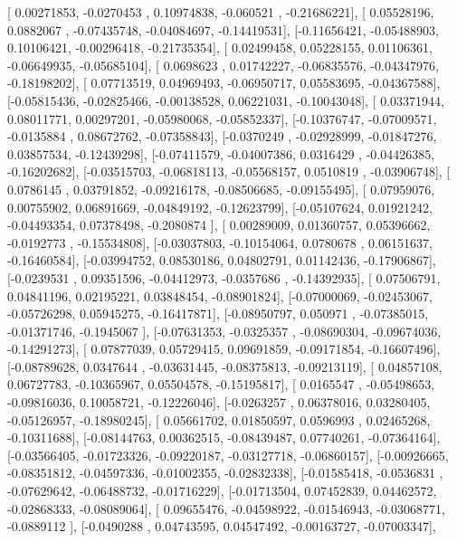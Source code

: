 \documentclass{article}
\begin{document}
       [ 0.00271853, -0.0270453 ,  0.10974838, -0.060521  , -0.21686221],
       [ 0.05528196,  0.0882067 , -0.07435748, -0.04084697, -0.14419531],
       [-0.11656421, -0.05488903,  0.10106421, -0.00296418, -0.21735354],
       [ 0.02499458,  0.05228155,  0.01106361, -0.06649935, -0.05685104],
       [ 0.0698623 ,  0.01742227, -0.06835576, -0.04347976, -0.18198202],
       [ 0.07713519,  0.04969493, -0.06950717,  0.05583695, -0.04367588],
       [-0.05815436, -0.02825466, -0.00138528,  0.06221031, -0.10043048],
       [ 0.03371944,  0.08011771,  0.00297201, -0.05980068, -0.05852337],
       [-0.10376747, -0.07009571, -0.0135884 ,  0.08672762, -0.07358843],
       [-0.0370249 , -0.02928999, -0.01847276,  0.03857534, -0.12439298],
       [-0.07411579, -0.04007386,  0.0316429 , -0.04426385, -0.16202682],
       [-0.03515703, -0.06818113, -0.05568157,  0.0510819 , -0.03906748],
       [ 0.0786145 ,  0.03791852, -0.09216178, -0.08506685, -0.09155495],
       [ 0.07959076,  0.00755902,  0.06891669, -0.04849192, -0.12623799],
       [-0.05107624,  0.01921242, -0.04493354,  0.07378498, -0.2080874 ],
       [ 0.00289009,  0.01360757,  0.05396662, -0.0192773 , -0.15534808],
       [-0.03037803, -0.10154064,  0.0780678 ,  0.06151637, -0.16460584],
       [-0.03994752,  0.08530186,  0.04802791,  0.01142436, -0.17906867],
       [-0.0239531 ,  0.09351596, -0.04412973, -0.0357686 , -0.14392935],
       [ 0.07506791,  0.04841196,  0.02195221,  0.03848454, -0.08901824],
       [-0.07000069, -0.02453067, -0.05726298,  0.05945275, -0.16417871],
       [-0.08950797,  0.050971  , -0.07385015, -0.01371746, -0.1945067 ],
       [-0.07631353, -0.0325357 , -0.08690304, -0.09674036, -0.14291273],
       [ 0.07877039,  0.05729415,  0.09691859, -0.09171854, -0.16607496],
       [-0.08789628,  0.0347644 , -0.03631445, -0.08375813, -0.09213119],
       [ 0.04857108,  0.06727783, -0.10365967,  0.05504578, -0.15195817],
       [ 0.0165547 , -0.05498653, -0.09816036,  0.10058721, -0.12226046],
       [-0.0263257 ,  0.06378016,  0.03280405, -0.05126957, -0.18980245],
       [ 0.05661702,  0.01850597,  0.0596993 ,  0.02465268, -0.10311688],
       [-0.08144763,  0.00362515, -0.08439487,  0.07740261, -0.07364164],
       [-0.03566405, -0.01723326, -0.09220187, -0.03127718, -0.06860157],
       [-0.00926665, -0.08351812, -0.04597336, -0.01002355, -0.02832338],
       [-0.01585418, -0.0536831 , -0.07629642, -0.06488732, -0.01716229],
       [-0.01713504,  0.07452839,  0.04462572, -0.02868333, -0.08089064],
       [ 0.09655476, -0.04598922, -0.01546943, -0.03068771, -0.0889112 ],
       [-0.0490288 ,  0.04743595,  0.04547492, -0.00163727, -0.07003347],
\end{document}
